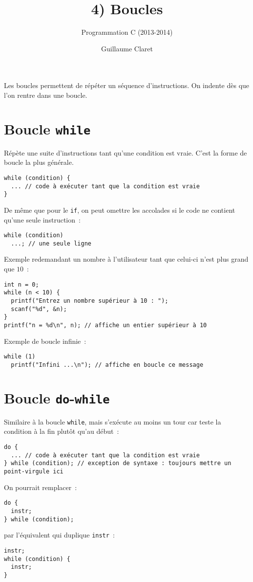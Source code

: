 \documentclass[a4paper,10pt]{article}
\begin{document}
  \title{4) Boucles}
  \author{Programmation C (2013-2014)}
  \date{Guillaume Claret}
  \maketitle
  
  Les boucles permettent de répéter un séquence d'instructions. On indente dès que l'on rentre dans une boucle.
  
  \section{Boucle \texttt{while}}
  Répète une suite d'instructions tant qu'une condition est vraie. C'est la forme de boucle la plus générale.
  \begin{verbatim}
while (condition) {
  ... // code à exécuter tant que la condition est vraie
}
  \end{verbatim}
  De même que pour le \texttt{if}, on peut omettre les accolades si le code ne contient qu'une seule instruction~:
  \begin{verbatim}
while (condition)
  ...; // une seule ligne
  \end{verbatim}
  Exemple redemandant un nombre à l'utilisateur tant que celui-ci n'est plus grand que $10$~:
  \begin{verbatim}
int n = 0;
while (n < 10) {
  printf("Entrez un nombre supérieur à 10 : ");
  scanf("%d", &n);
}
printf("n = %d\n", n); // affiche un entier supérieur à 10
  \end{verbatim}
  Exemple de boucle infinie~:
  \begin{verbatim}
while (1)
  printf("Infini ...\n"); // affiche en boucle ce message
  \end{verbatim}
  
  \section{Boucle \texttt{do}-\texttt{while}}
  Similaire à la boucle \texttt{while}, mais s'exécute au moins un tour car teste la condition à la fin plutôt qu'au début~:
  \begin{verbatim}
do {
  ... // code à exécuter tant que la condition est vraie
} while (condition); // exception de syntaxe : toujours mettre un point-virgule ici
  \end{verbatim}
  On pourrait remplacer~:
  \begin{verbatim}
do {
  instr;
} while (condition);
  \end{verbatim}
  par l'équivalent qui duplique \texttt{instr}~:
  \begin{verbatim}
instr;
while (condition) {
  instr;
}
  \end{verbatim}
  
\end{document}
